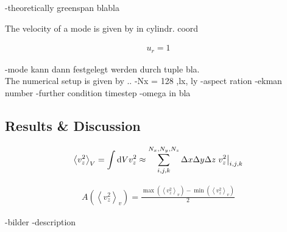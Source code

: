 -theoretically greenspan  blabla

The velocity of a mode is given by in cylindr. coord

\begin{align}
    u_r =  1
\end{align}


-mode kann dann festgelegt werden durch tuple bla.\\
The numerical setup is  given by ..
-Nx  = 128 ,lx, ly
-aspect ration
-ekman number
-further condition timestep
-omega in bla
\newpage

\subsection{Results \& Discussion}




\begin{align}
    \left<v_z^2 \right>_{V} =  \int \mathop{}\!\mathrm{d} V v_z^2 \approx \sum_{i, j, k}^{N_x,N_y,N_z} \Delta x \Delta y \Delta z \left.v_z^2 \right|_{i,j,k}
\end{align}

\begin{align}
    A\left(\left<v_z^2\right>_{v}\right) = \frac{\max(\left<v_z^2\right>_{v}) - \min(\left<v_z^2\right>_{v})}{2}
\end{align}

-bilder
-description


